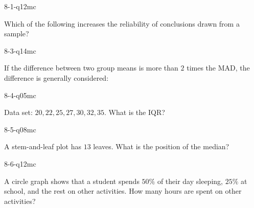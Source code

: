 \begin{practiceQuestion}{8-1-q12}{mc}
\begin{questionText}
Which of the following increases the reliability of conclusions drawn from a sample?
\end{questionText}
\end{practiceQuestion}

\begin{practiceQuestion}{8-3-q14}{mc}
\begin{questionText}
If the difference between two group means is more than $2$ times the MAD, the difference is generally considered:
\end{questionText}
\end{practiceQuestion}

\begin{practiceQuestion}{8-4-q05}{mc}
\begin{questionText}
Data set: $20, 22, 25, 27, 30, 32, 35$. What is the IQR?
\end{questionText}
\end{practiceQuestion}

\begin{practiceQuestion}{8-5-q08}{mc}
\begin{questionText}
A stem-and-leaf plot has $13$ leaves. What is the position of the median?
\end{questionText}
\end{practiceQuestion}

\begin{practiceQuestion}{8-6-q12}{mc}
\begin{questionText}
A circle graph shows that a student spends $50\%$ of their day sleeping, $25\%$ at school, and the rest on other activities. How many hours are spent on other activities?
\end{questionText}
\end{practiceQuestion}

